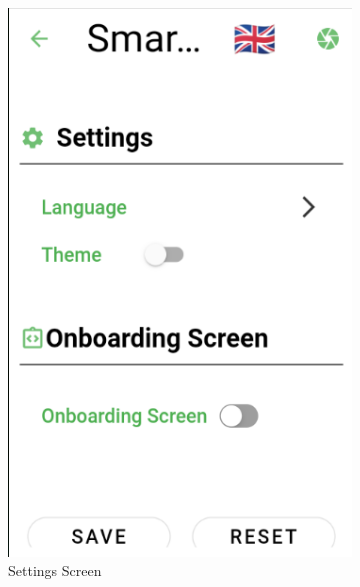 \documentclass[a4paper,12pt]{report}
\begin{document}
\begin{figure}[H]	
	\begin{subfigure}{0.3\textwidth}
		\includegraphics[width=\textwidth]{./images/settings/settings_screen.png}
		\caption{Settings Screen}
		\label{fig:settings}
	\end{subfigure}
	\hfill
	\begin{subfigure}{0.3\textwidth}

\end{subfigure}
\end{figure}
\end{document}
